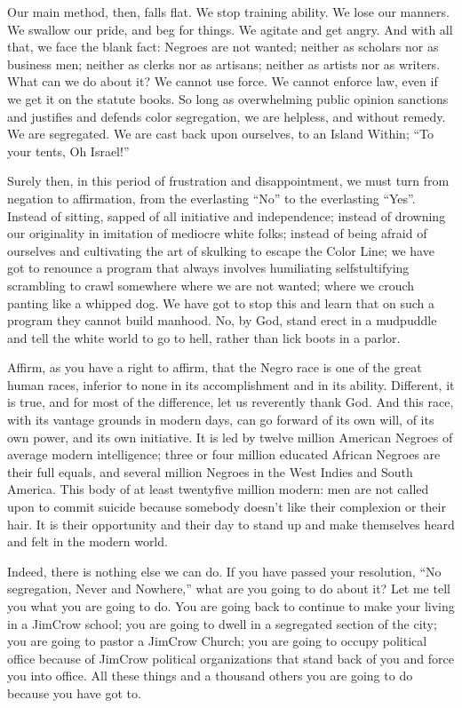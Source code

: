 \documentclass[letterpaper,10pt,english]{jupyterBook}
\begin{document}
\sphinxAtStartPar
Our main method, then, falls flat. We stop training ability. We lose our manners. We swallow our pride, and beg for things. We agitate and get angry. And with all that, we face the blank fact: Negroes are not wanted; neither as scholars nor as business men; neither as clerks nor as artisans; neither as artists nor as writers. What can we do about it? We cannot use force. We cannot enforce law, even if we get it on the statute books. So long as overwhelming public opinion sanctions and justifies and defends color segregation, we are helpless, and without remedy. We are segregated. We are cast back upon ourselves, to an Island Within; “To your tents, Oh Israel!”

\sphinxAtStartPar
Surely then, in this period of frustration and disappointment, we must turn from negation to affirmation, from the ever\sphinxhyphen{}lasting “No” to the ever\sphinxhyphen{}lasting “Yes”. Instead of sitting, sapped of all initiative and independence; instead of drowning our originality in imitation of mediocre white folks; instead of being afraid of ourselves and cultivating the art of skulking to escape the Color Line; we have got to renounce a program that always involves humiliating self\sphinxhyphen{}stultifying scrambling to crawl somewhere where we are not wanted; where we crouch panting like a whipped dog. We have got to stop this and learn that on such a program they cannot build manhood. No, by God, stand erect in a mud\sphinxhyphen{}puddle and tell the white world to go to hell, rather than lick boots in a parlor.

\sphinxAtStartPar
Affirm, as you have a right to affirm, that the Negro race is one of the great human races, inferior to none in its accomplishment and in its ability. Different, it is true, and for most of the difference, let us reverently thank God. And this race, with its vantage grounds in modern days, can go forward of its own will, of its own power, and its own initiative. It is led by twelve million American Negroes of average modern intelligence; three or four million educated African Negroes are their full equals, and several million Negroes in the West Indies and South America. This body of at least twenty\sphinxhyphen{}five million modern: men are not called upon to commit suicide because somebody doesn’t like their complexion or their hair. It is their opportunity and their day to stand up and make themselves heard and felt in the modern world.

\sphinxAtStartPar
Indeed, there is nothing else we can do. If you have passed your resolution, “No segregation, Never and Nowhere,” what are you going to do about it? Let me tell you what you are going to do. You are going back to continue to make your living in a Jim\sphinxhyphen{}Crow school; you are going to dwell in a segregated section of the city; you are going to pastor a Jim\sphinxhyphen{}Crow Church; you are going to occupy political office because of Jim\sphinxhyphen{}Crow political organizations that stand back of you and force you into office. All these things and a thousand others you are going to \sphinxhyphen{}do because you have got to.
\end{document}
